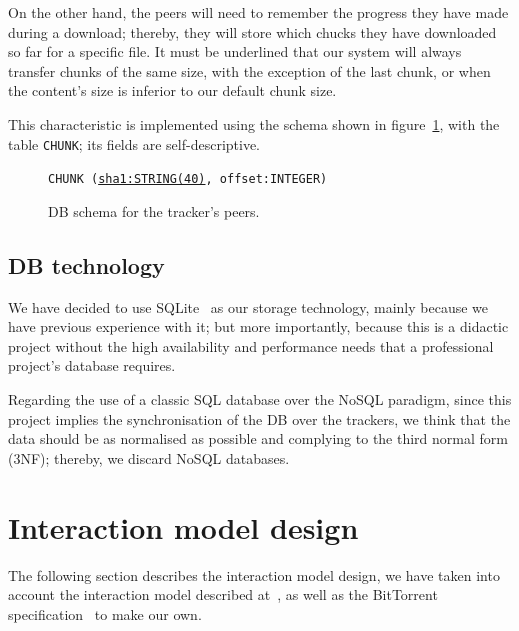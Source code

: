 \documentclass[twoside,a4paper,10pt]{article}
\begin{document}
On the other hand, the peers will need to remember the
progress they have made during a download; thereby, they will store which chucks
they have downloaded so far for a specific file. It must be underlined that our
system will always transfer chunks of the same size, with the exception of the
last chunk, or when the content's size is inferior to our default chunk size.

This characteristic is implemented using the schema shown in
figure~\ref{fig:schema-P}, with the table \texttt{CHUNK}; its
fields are self-descriptive.

\begin{figure}[h]
  \centering
  \texttt{CHUNK (\underline{sha1:STRING(40)}, offset:INTEGER)}
  
  \centering
  \caption{\label{fig:schema-P}DB schema for the tracker's peers.}
\end{figure}

\subsection{DB technology}

We have decided to use SQLite~\cite{sqlite} as our storage technology,
mainly because we have previous experience with it; but more importantly,
because this is a didactic project without the high availability and performance
needs that a professional project's database requires.

Regarding the use of a classic SQL database over the NoSQL paradigm, since
this project implies the synchronisation of the DB over the trackers, we think
that the data should be as normalised as possible and complying to the third
normal form (3NF); thereby, we discard NoSQL databases.

\section{Interaction model design}

The following section describes the interaction model design, we have taken
into account the interaction model described at~\cite{libtorrent}, as well as
the BitTorrent specification~\cite{bep03,bep15,bep23} to make our own.
\end{document}
